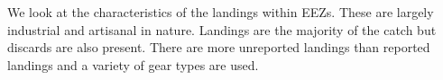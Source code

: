 \documentclass[
]{article}
\newenvironment{Shaded}{\begin{snugshade}}{\end{snugshade}}
\newcommand{\CommentTok}[1]{\textcolor[rgb]{0.37,0.37,0.37}{#1}}
\newcommand{\DecValTok}[1]{\textcolor[rgb]{0.68,0.00,0.00}{#1}}
\newcommand{\FloatTok}[1]{\textcolor[rgb]{0.68,0.00,0.00}{#1}}
\newcommand{\NormalTok}[1]{\textcolor[rgb]{0.00,0.23,0.31}{#1}}
\newcommand{\OtherTok}[1]{\textcolor[rgb]{0.00,0.23,0.31}{#1}}
\newcommand{\SpecialCharTok}[1]{\textcolor[rgb]{0.37,0.37,0.37}{#1}}
\begin{document}
\begin{Shaded}
\end{Shaded}

We look at the characteristics of the landings within EEZs. These are
largely industrial and artisanal in nature. Landings are the majority of
the catch but discards are also present. There are more unreported
landings than reported landings and a variety of gear types are used.
\end{document}
